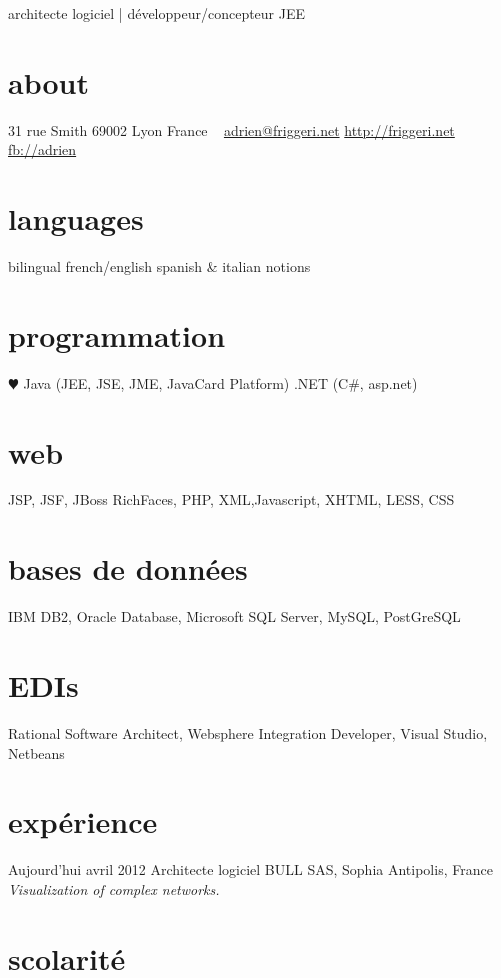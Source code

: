 \documentclass[]{roger-cv}
\begin{document}
       {architecte logiciel | développeur/concepteur JEE}


\begin{aside}
  \section{about}
    31 rue Smith
    69002 Lyon
    France
    ~
    \href{mailto:adrien@friggeri.net}{adrien@friggeri.net}
    \href{http://friggeri.net}{http://friggeri.net}
    \href{http://facebook.com/adrien}{fb://adrien}
  \section{languages}
    bilingual french/english
    spanish \& italian notions
  \section{programmation}
    {\color{red} $\varheartsuit$} Java (JEE, JSE, JME, JavaCard Platform)
    .NET (C\#, asp.net)
  \section{web}
    {JSP, JSF, JBoss RichFaces, PHP, XML,Javascript, XHTML, LESS, CSS}
  \section{bases de données}
    {IBM DB2, Oracle Database, Microsoft SQL Server, MySQL, PostGreSQL}
  \section{EDIs}
    {Rational Software Architect, Websphere Integration Developer, Visual Studio, Netbeans}
\end{aside}

\section{expérience}

\begin{entrylist}
  \entry
    {Aujourd'hui}
    {avril 2012}
    {Architecte logiciel}
    {BULL SAS, Sophia Antipolis, France}  
    {\emph{Visualization of complex networks.}}
\end{entrylist}

\section{scolarité}
\end{document}
